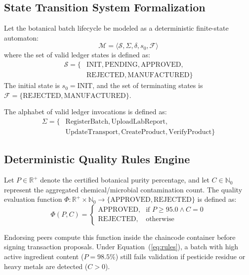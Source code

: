 \documentclass[conference]{IEEEtran}
\begin{document}
\subsection{State Transition System Formalization}
Let the botanical batch lifecycle be modeled as a deterministic finite-state automaton:
\begin{equation}
    \mathcal{M} = \langle \mathcal{S}, \Sigma, \delta, s_0, \mathcal{F} \rangle
\end{equation}
where the set of valid ledger states is defined as:
\begin{equation}
\begin{split}
    \mathcal{S} = \{ & \text{INIT}, \text{PENDING}, \text{APPROVED}, \\
    & \text{REJECTED}, \text{MANUFACTURED} \}
\end{split}
\end{equation}
The initial state is $s_0 = \text{INIT}$, and the set of terminating states is $\mathcal{F} = \{ \text{REJECTED}, \text{MANUFACTURED} \}$. 

The alphabet of valid ledger invocations is defined as:
\begin{equation}
\begin{split}
    \Sigma = \{ & \text{RegisterBatch}, \text{UploadLabReport}, \\
    & \text{UpdateTransport}, \text{CreateProduct}, \text{VerifyProduct} \}
\end{split}
\end{equation}

\subsection{Deterministic Quality Rules Engine}
Let $P \in \mathbb{R}^+$ denote the certified botanical purity percentage, and let $C \in \mathbb{N}_0$ represent the aggregated chemical/microbial contamination count. The quality evaluation function $\Phi: \mathbb{R}^+ \times \mathbb{N}_0 \to \{ \text{APPROVED}, \text{REJECTED} \}$ is defined as:
\begin{equation}
    \Phi(P, C) = \begin{cases} 
        \text{APPROVED}, & \text{if } P \ge 95.0 \land C = 0 \\
        \text{REJECTED}, & \text{otherwise}
    \end{cases}
    \label{eq:rules}
\end{equation}

Endorsing peers compute this function inside the chaincode container before signing transaction proposals. Under Equation~(\ref{eq:rules}), a batch with high active ingredient content ($P = 98.5\%$) still fails validation if pesticide residue or heavy metals are detected ($C > 0$).
\end{document}
